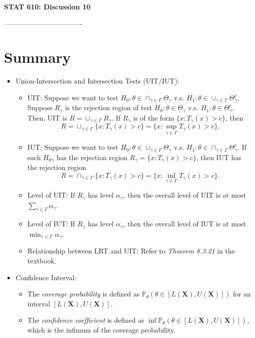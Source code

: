 \documentclass[12pt]{extarticle}
\newcommand{\p}{\mathbb P}
\newcommand{\X}{\mathbf X}
\begin{document}
	
	\begin{center}
		{\large \bf STAT 610: Discussion 10}
	\end{center}
	\vspace{0.22cm}
----------------------------------%
\section{Summary}
\begin{itemize}
    \item Union-Intersection and Intersection Tests (UIT/IUT): 
    \begin{itemize}
		\item UIT: Suppose we want to test $H_0: \theta \in \cap_{\gamma\in\Gamma}\Theta_\gamma$ v.s. $H_1: \theta\in \cup_{\gamma\in\Gamma}\Theta_\gamma^c$. Suppose $R_\gamma$ is the rejection region of test $H_0: \theta \in \Theta_\gamma$ v.s. $H_1: \theta\in\Theta_\gamma^c$. Then, UIT is $R = \cup_{\gamma\in\Gamma}R_\gamma$. If $R_\gamma$ is of the form $\{x:T_\gamma(x) > c\}$, then $$R = \cup_{\gamma\in\Gamma}\{x:T_\gamma(x) > c\} = \{x:\sup_{\gamma\in\Gamma}T_\gamma(x) > c\}.$$
		\item IUT: Suppose we want to test $H_0: \theta \in \cup_{\gamma\in\Gamma}\Theta_\gamma$ v.s. $H_1: \theta\in \cap_{\gamma\in\Gamma}\Theta_\gamma^c$. If each $H_{0\gamma}$ has the rejection region $R_\gamma = \{x:T_\gamma(x) > c\}$, then IUT has the rejection region 
		$$R = \cap_{\gamma\in\Gamma}\{x:T_\gamma(x) > c\} = \{x:\inf_{\gamma\in\Gamma}T_\gamma(x) > c\}.$$
		\item Level of UIT: If $R_\gamma$ has level $\alpha_\gamma$, then the overall level of UIT is at most $\sum_{\gamma\in\Gamma}\alpha_\gamma$.
		\item Level of IUT: If $R_\gamma$ has level $\alpha_\gamma$, then the overall level of IUT is at most $\min_{\gamma\in\Gamma}\alpha_\gamma$.
		\item Relationship between LRT and UIT: Refer to \textit{Theorem 8.3.21} in the textbook.
	\end{itemize}
	\item Confidence Interval:
	\begin{itemize}
		\item The \textit{coverage probability} is defined as $\p_\theta(\theta\in[L(\X), U(\X)])$ for an interval $[L(\X), U(\X)]$.
		\item The \textit{confidence coefficient} is defined as $\inf\p_\theta(\theta\in[L(\X), U(\X)])$, which is the infimum of the coverage probability.

\end{itemize}
\end{itemize}
\end{document}
